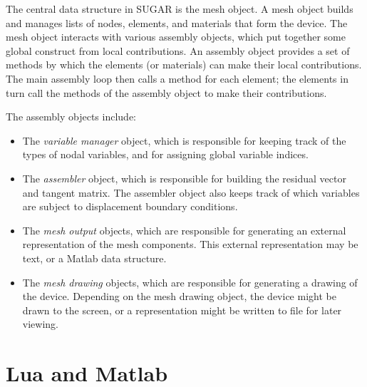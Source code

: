 The central data structure in SUGAR is the mesh object.
A mesh object builds and manages lists of nodes, elements,
and materials that form the device.  The mesh object
interacts with various assembly objects, which put together
some global construct from local contributions.  An assembly 
object provides a set of methods by which the elements 
(or materials) can make their local contributions.  The main
assembly loop then calls a method for each element; the elements
in turn call the methods of the assembly object to make their
contributions.

The assembly objects include:
\begin{itemize}

  \item The \emph{variable manager} object, which is responsible
        for keeping track of the types of nodal variables,
        and for assigning global variable indices.

  \item The \emph{assembler} object, which is responsible for
        building the residual vector and tangent matrix.
        The assembler object also keeps track of which variables
        are subject to displacement boundary conditions.

  \item The \emph{mesh output} objects, which are responsible
        for generating an external representation of the mesh
        components.  This external representation may be text,
        or a Matlab data structure.

  \item The \emph{mesh drawing} objects, which are responsible
        for generating a drawing of the device.  Depending on
        the mesh drawing object, the device might be drawn
        to the screen, or a representation might be written to
        file for later viewing.

\end{itemize}


\section{Lua and Matlab}


